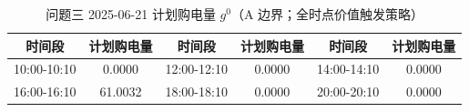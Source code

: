 \begin{table}[htbp]
\centering
\caption{问题三 2025-06-21 计划购电量 $g^0$（A 边界；全时点价值触发策略）}\label{tab:q3-purchase}
\normalsize\setlength{\tabcolsep}{5pt}
\begin{tabular}{@{}cccccc@{}}
\toprule
时间段 & 计划购电量 & 时间段 & 计划购电量 & 时间段 & 计划购电量 \\
\midrule
10:00-10:10 & 0.0000 & 12:00-12:10 & 0.0000 & 14:00-14:10 & 0.0000 \\
16:00-16:10 & 61.0032 & 18:00-18:10 & 0.0000 & 20:00-20:10 & 0.0000 \\
\bottomrule
\end{tabular}
\end{table}
